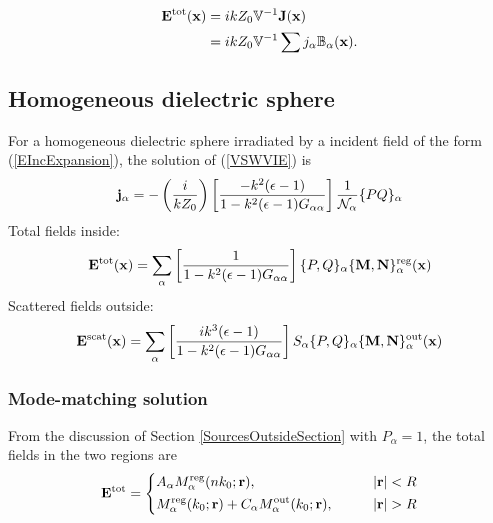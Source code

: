 \documentclass[letterpaper]{article}
\begin{document}
\begin{align*} 
 \mathbf{E}^{\text{\scriptsize tot}}(\mathbf{x})
&= ikZ_0 \mathbb{V}^{-1} \mathbf{J}(\mathbf{x}) 
\\
&= ikZ_0 \mathbb{V}^{-1} \sum j_\alpha \mathbb{B}_\alpha(\mathbf{x}).
\end{align*} 

\subsection{Homogeneous dielectric sphere}

For a homogeneous dielectric sphere irradiated by a incident
field of the form (\ref{EIncExpansion}), the solution of
(\ref{VSWVIE}) is
$$ \mathbf{j}_\alpha = -\left(\frac{i}{kZ_0}\right)
   \left[ \frac{-k^2 (\epsilon-1)}{1-k^2 (\epsilon-1)G_{\alpha\alpha}}
   \right]\frac{1}{\mathcal{N}_\alpha}\{PQ\}_\alpha
$$
Total fields inside:
$$ \mathbf{E}^{\text{\scriptsize tot}}(\mathbf{x}) =
    \sum_\alpha \left[ \frac{1}{1-k^2(\epsilon-1)G_{\alpha\alpha}}\right]
                \{P,Q\}_{\alpha} \{\mathbf{M},\mathbf{N}\}^{\text{\scriptsize reg}}_\alpha(\mathbf{x})
$$
Scattered fields outside:
$$ \mathbf{E}^{\text{\scriptsize scat}}(\mathbf{x}) =
    \sum_\alpha 
    \left[ \frac{ik^3(\epsilon-1)}{1-k^2(\epsilon-1)G_{\alpha\alpha}}\right]
           S_\alpha \{P,Q\}_{\alpha} \{\mathbf{M},\mathbf{N}\}^{\text{\scriptsize out}}_\alpha(\mathbf{x})
$$

\subsubsection*{Mode-matching solution}

From the discussion of Section \ref{SourcesOutsideSection}
with $P_\alpha=1$, the total fields in the two regions are
$$
 \vb E\sups{tot}
 =
\begin{dcases}
  A_\alpha M_\alpha\sups{reg}(nk_0; \vb r), \qquad &|\vb r|<R\\
  M_\alpha\sups{reg}(k_0; \vb r)
    + C_\alpha M_\alpha\sups{out}(k_0; \vb r), \qquad &|\vb r|>R
\end{dcases}
$$
\end{document}
